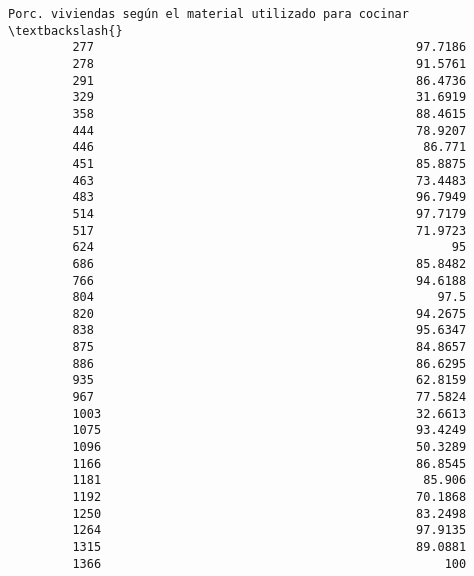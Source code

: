 \documentclass[11pt]{article}
\begin{document}
\begin{Verbatim}[commandchars=\\\{\}]
              Porc. viviendas según el material utilizado para cocinar   \textbackslash{}
         277                                             97.7186          
         278                                             91.5761          
         291                                             86.4736          
         329                                             31.6919          
         358                                             88.4615          
         444                                             78.9207          
         446                                              86.771          
         451                                             85.8875          
         463                                             73.4483          
         483                                             96.7949          
         514                                             97.7179          
         517                                             71.9723          
         624                                                  95          
         686                                             85.8482          
         766                                             94.6188          
         804                                                97.5          
         820                                             94.2675          
         838                                             95.6347          
         875                                             84.8657          
         886                                             86.6295          
         935                                             62.8159          
         967                                             77.5824          
         1003                                            32.6613          
         1075                                            93.4249          
         1096                                            50.3289          
         1166                                            86.8545          
         1181                                             85.906          
         1192                                            70.1868          
         1250                                            83.2498          
         1264                                            97.9135          
         1315                                            89.0881          
         1366                                                100          
         

\end{Verbatim}
\end{document}
